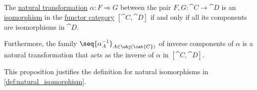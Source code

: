 \begin{proposition}\label{thm:natural_isomorphism}
  The \hyperref[def:natural_transformation]{natural transformation} \( \alpha: F \Rightarrow G \) between the pair \( F, G: \cat{C} \to \cat{D} \) is an \hyperref[def:morphism_invertibility/isomorphism]{isomorphism} in the \hyperref[def:functor_category]{functor category} \( [\cat{C}, \cat{D}] \) if and only if all its components are isomorphisms in \( \cat{D} \).

  Furthermore, the family \( \seq{ \alpha_A^{-1} }_{A \in \obj(\cat{C})} \) of inverse components of \( \alpha \) is a natural transformation that acts as the inverse of \( \alpha \) in \( [\cat{C}, \cat{D}] \).
\end{proposition}
\begin{comments}
  \item This proposition justifies the definition for natural isomorphisms in \cref{def:natural_isomorphism}.
\end{comments}
